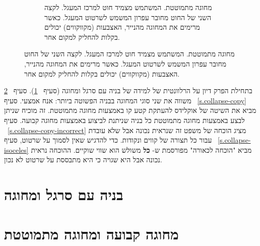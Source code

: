 \begin{figure}
\begin{center}
\begin{subfigure}[b]{.4\textwidth}
\caption{%
מחוגה מתמוטטת. המשתמש מצמיד חוט למרכז המעגל. לקצה השני של החוט מחובר עפרון המשמש לשרטוט המעגל. כאשר מרימים את המחוגה מהנייר, האצבעות (מקווקווים) יכולים בקלות להחליק למקום אחר.%
}\label{fig.collapsing-compass}
\end{subfigure}
\end{center}
\end{figure}

בתחילת הפרק דיון על הרלוונטית של למידה של בניה עם סרגל ומחוגה (סעיף%
~\ref{s.relevance}).
סעיף%
~\ref{s.collapse} 
משווה את שני סוגי המחוגה בבניה הפשוטה ביותר: אנח אמצעי. סעיף%
~\ref{s.collapse-copy}
מביא את השיטה של אוקלידס להעתקת קטע קו באמצעות מחוגה מתמוטטת. זה מוכיח שניתן לבצע באמצעות מחוגה מתמוטטת כל בניה שניתנת לביצוע באמצעות מחוגה קבועה. סעיף%
~\ref{s.collapse-copy-incorrect} 
מציג הוכחה של משפט זה שנראית נכונה אבל שלא עובדת עבור כל תצורה של קווים ונקודות. כדי להדגיש שאין לסמוך על שרטוט, סעיף%
~\ref{s.collapse-isoceles}
מביא "הוכחה לכאורה" מפורסמת ש-
\textbf{כל}
משולש הוא שווי שוקיים. ההוכחה נראית נכונה אבל היא שגויה כי היא מתבססת על שרטוט לא נכון.


\section{בניה עם סרגל ומחוגה}\label{s.relevance}


\section{מחוגה קבועה ומחוגה מתמוטטת}\label{s.collapse}

